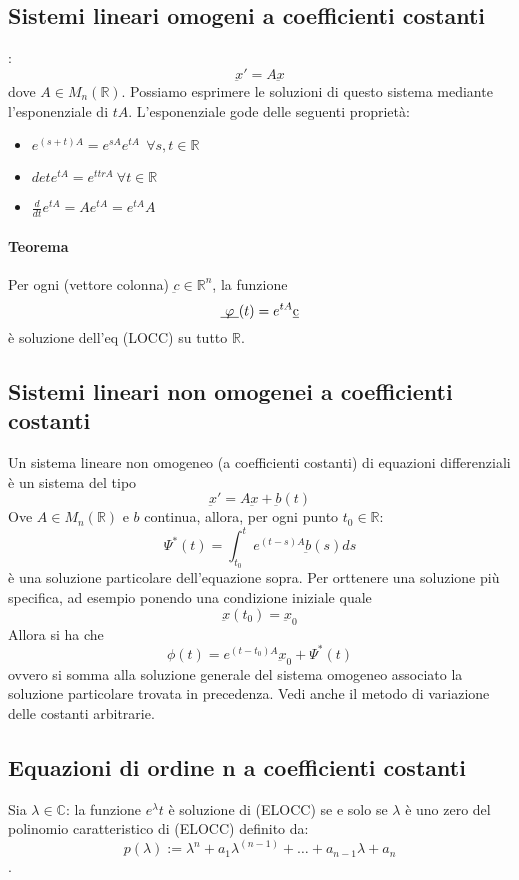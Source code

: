 \documentclass[a4paper,12pt]{article}
\begin{document}
\subsection{Sistemi lineari omogeni a coefficienti costanti}:
$$\underbar{x}' = A\underbar{x}$$
dove $A \in M_n(\mathbb{R})$. Possiamo esprimere le soluzioni di questo sistema mediante l'esponenziale di $tA$.
L'esponenziale gode delle seguenti proprietà:
\begin{itemize}
\item $e^{(s+t)A} = e^{sA}e^{tA} \ \ \forall s,t \in \mathbb{R} $
\item $det e^{tA}=e^{ttrA} \ \forall t \in \mathbb{R} $
\item $	\frac{d}{dt} e^{tA} = A e^{tA} = e^{tA}A$
\end{itemize}

\paragraph{Teorema} Per ogni (vettore colonna) $\underbar{c} \in \mathbb{R}^n $, la funzione $$ \underbar{ $\varphi$ }(t) = e^{tA} \underbar{c} $$è soluzione dell'eq (LOCC) su tutto $\mathbb{R}$.

\subsection{Sistemi lineari non omogenei a coefficienti costanti}
Un sistema lineare non omogeneo (a coefficienti costanti) di equazioni differenziali è un sistema del tipo
$$\underbar{x}'=A\underbar{x}+\underbar{b}(t)$$
Ove $A\in M_n(\mathbb{R})$ e $b$ continua, allora, per ogni punto $t_0 \in \mathbb{R}$:
$$\Psi^*(t)= \int_{t_0}^t e^{(t-s)A} \underbar{b}(s)ds$$
è una soluzione particolare dell'equazione sopra.
Per orttenere una soluzione più specifica, ad esempio ponendo una condizione iniziale quale
$$\underbar{x}(t_0)=\underbar{x}_0$$
Allora si ha che
$$\phi(t)=e^{(t-t_0)A}\underbar{x}_0+\Psi^*(t)$$
ovvero si somma alla soluzione generale del sistema omogeneo associato la soluzione particolare trovata in precedenza.
Vedi anche il metodo di variazione delle costanti arbitrarie.

\subsection{Equazioni di ordine n a coefficienti costanti}
Sia $\lambda \in \mathbb{C}$: la funzione $e^\lambda t$ è soluzione di (ELOCC) se e solo se $\lambda$ è uno zero del polinomio caratteristico di (ELOCC) definito da: $$ p(\lambda) := \lambda^n + a_1\lambda^{(n-1)}+ \dots +a_{n-1}\lambda+a_n$$. 
\end{document}
